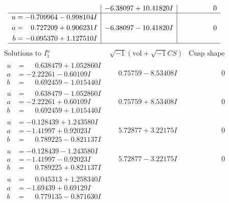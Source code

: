 \documentclass[1p]{elsarticle_modified}
\theoremstyle{definition}
\newcommand{\I}{\sqrt{-1}}
\begin{document}
$$\begin{array}{c|c|c}
 & -6.38097 + 10.41820 I & \phantom{-0.000000 } 0 \\ \hline\begin{aligned}
u &= -0.709964 - 0.998104 I \\
a &= \phantom{-}0.727209 + 0.906231 I \\
b &= -0.095370 + 1.127510 I\end{aligned}
 & -6.38097 - 10.41820 I & \phantom{-0.000000 } 0\\
 \hline 
 \end{array}$$\newpage$$\begin{array}{c|c|c}  
\text{Solutions to }I^u_{1}& \I (\text{vol} + \sqrt{-1}CS) & \text{Cusp shape}\\
 \hline 
\begin{aligned}
u &= \phantom{-}0.638479 + 1.052860 I \\
a &= -2.22261 - 0.60109 I \\
b &= \phantom{-}0.692459 - 1.015440 I\end{aligned}
 & \phantom{-}0.75759 - 8.53408 I & \phantom{-0.000000 } 0 \\ \hline\begin{aligned}
u &= \phantom{-}0.638479 - 1.052860 I \\
a &= -2.22261 + 0.60109 I \\
b &= \phantom{-}0.692459 + 1.015440 I\end{aligned}
 & \phantom{-}0.75759 + 8.53408 I & \phantom{-0.000000 } 0 \\ \hline\begin{aligned}
u &= -0.128439 + 1.243580 I \\
a &= -1.41997 + 0.92023 I \\
b &= \phantom{-}0.789225 - 0.821137 I\end{aligned}
 & \phantom{-}5.72877 + 3.22175 I & \phantom{-0.000000 } 0 \\ \hline\begin{aligned}
u &= -0.128439 - 1.243580 I \\
a &= -1.41997 - 0.92023 I \\
b &= \phantom{-}0.789225 + 0.821137 I\end{aligned}
 & \phantom{-}5.72877 - 3.22175 I & \phantom{-0.000000 } 0 \\ \hline\begin{aligned}
u &= \phantom{-}0.045313 + 1.258340 I \\
a &= -1.69439 + 0.69129 I \\
b &= \phantom{-}0.779135 - 0.871630 I\end{aligned}

\end{array}$$
\end{document}
